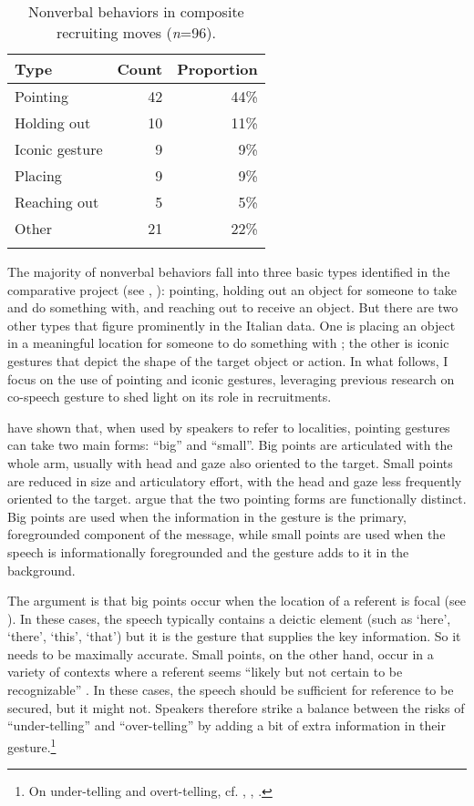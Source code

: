 \documentclass[output=paper,modfonts]{langscibook}
\begin{document}
\begin{table}
\begin{tabularx}{.55\textwidth}{Xrr}
\lsptoprule
Type & Count & Proportion \\
\midrule
Pointing & 42 & 44\% \\
Holding out & 10 & 11\% \\
Iconic gesture & 9 & 9\% \\
Placing & 9 & 9\% \\
Reaching out & 5 & 5\% \\
Other & 21 & 22\% \\
\lspbottomrule
\end{tabularx}
\caption{Nonverbal behaviors in composite recruiting moves (\textit{n}=96).}
\label{tab:rossi:1}
\end{table}

The majority of nonverbal behaviors fall into three basic types identified in the comparative project (see , ): pointing, holding out an object for someone to take and do something with, and reaching out to receive an object. But there are two other types that figure prominently in the Italian data. One is placing an object in a meaningful location for someone to do something with \citep[249-50]{Clark2003}; the other is iconic gestures that depict the shape of the target object or action. In what follows, I focus on the use of pointing and iconic gestures, leveraging previous research on co-speech gesture to shed light on its role in recruitments.

\citet{EnfieldKitaRuiter2007} have shown that, when used by speakers to refer to localities, pointing gestures can take two main forms: “big” and “small”. Big points are articulated with the whole arm, usually with head and gaze also oriented to the target. Small points are reduced in size and articulatory effort, with the head and gaze less frequently oriented to the target. \citeauthor{EnfieldKitaRuiter2007} argue that the two pointing forms are functionally distinct. Big points are used when the information in the gesture is the primary, foregrounded component of the message, while small points are used when the speech is informationally foregrounded and the gesture adds to it in the background.

The argument is that big points occur when the location of a referent is focal (see \citealt[chap. 5]{Lambrecht1994}). In these cases, the speech typically contains a deictic element (such as ‘here’, ‘there’, ‘this’, ‘that’) but it is the gesture that supplies the key information. So it needs to be maximally accurate. Small points, on the other hand, occur in a variety of contexts where a referent seems “likely but not certain to be recognizable” \citep[1730]{EnfieldKitaRuiter2007}. In these cases, the speech should be sufficient for reference to be secured, but it might not. Speakers therefore strike a balance between the risks of “under-telling” and “over-telling” by adding a bit of extra information in their gesture.\footnote{On under-telling and overt-telling, cf. \citet{Grice1975}, \citet{Levinson2000}, \citet[140]{Schegloff2007a}.}
\end{document}
